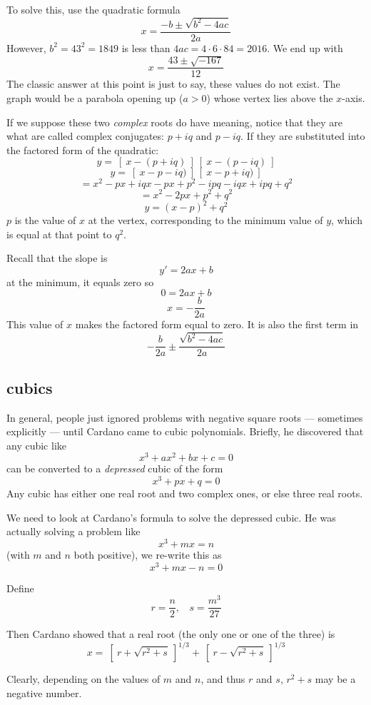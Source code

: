 \documentclass[11pt, oneside]{article}
\begin{document}
To solve this, use the quadratic formula
\[ x = \frac{-b \pm \sqrt{b^2 - 4ac}}{2a} \]
However, $b^2 = 43^2 = 1849$ is less than $4ac = 4 \cdot 6 \cdot 84 = 2016$.  We end up with
\[ x = \frac{43 \pm \sqrt{-167}}{12} \]
The classic answer at this point is just to say, these values do not exist.  The graph would be a parabola opening up ($a > 0$) whose vertex lies above the $x$-axis.

If we suppose these two \emph{complex} roots do have meaning, notice that they are what are called complex conjugates:  $p + iq$ and $p - iq$.  If they are substituted into the factored form of the quadratic:
\[ y = \ [ \ x - (p + iq) \ ] \ [ \ x - (p - iq) \ ] \]
\[ y = \ [ \ x - p - iq) \ ] \ [ \ x - p + iq) \ ] \]
\[ = x^2 - px + iqx - px + p^2 - ipq - iqx + ipq + q^2 \] 
\[ = x^2 - 2px + p^2 + q^2 \]
\[ y = (x-p)^2 + q^2 \]
$p$ is the value of $x$ at the vertex, corresponding to the minimum value of $y$, which is equal at that point to $q^2$.

Recall that the slope is
\[ y' = 2ax + b \]
at the minimum, it equals zero so
\[ 0 = 2ax + b \]
\[ x = -\frac{b}{2a} \]
This value of $x$ makes the factored form equal to zero.  It is also the first term in
\[ -\frac{b}{2a} \pm \frac{\sqrt{b^2 - 4ac}}{2a} \]

\subsection*{cubics}

In general, people just ignored problems with negative square roots  --- sometimes explicitly ---  until Cardano came to cubic polynomials.  Briefly, he discovered that any cubic like
\[ x^3 + ax^2 + bx + c = 0 \]
can be converted to a \emph{depressed} cubic of the form
\[ x^3 + px + q = 0 \]
Any cubic has either one real root and two complex ones, or else three real roots.  

We need to look at Cardano's formula to solve the depressed cubic.  He was actually solving a problem like
\[ x^3 + mx = n \]
(with $m$ and $n$ both positive), we re-write this as
\[ x^3 + mx - n = 0 \]

Define
\[ r = \frac{n}{2}, \ \ \ \  s = \frac{m^3}{27} \]

Then Cardano showed that a real root (the only one or one of the three) is
\[ x = \ [ \ r + \sqrt{r^2 + s} \ ]^{1/3} + \ [ \ r - \sqrt{r^2 + s} \ ]^{1/3} \]

Clearly, depending on the values of $m$ and $n$, and thus $r$ and $s$, $r^2 + s$ may be a negative number. 
\end{document}
